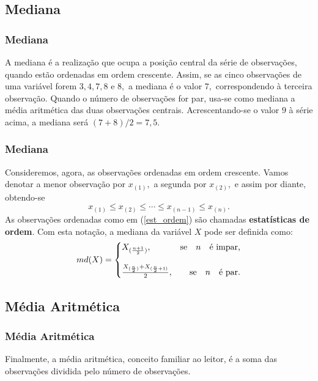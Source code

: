 \documentclass[14pt,aspectratio=1610]{beamer}
\begin{document}
\subsection{Mediana}
\begin{frame}{}
\frametitle{Mediana}
\begin{block}{}
\justifying
A mediana é a realização que ocupa a posição central da série de observações, quando estão ordenadas em ordem crescente. Assim, se as cinco observações de uma variável forem $3, 4, 7, 8$ e $8,$ a mediana é o valor $7,$ correspondendo à terceira 
observação. Quando o número de observações for par, usa-se como mediana a média aritmética das duas observações centrais. Acrescentando-se o valor $9$ à série acima, a mediana será $(7 + 8)/2 = 7,5.$
\end{block}
\end{frame}

\begin{frame}{}
\frametitle{Mediana}
\begin{block}{}
\justifying
Consideremos, agora, as observações ordenadas em ordem crescente. Vamos denotar a
menor observação por $x_{(1)},$ a segunda por $x_{(2)},$ e assim por diante, obtendo-se
\begin{equation}\label{est_ordem}
x_{(1)}\leq x_{(2)}\leq \cdots \leq x_{(n-1)}\leq x_{(n)}.
\end{equation}
As observações ordenadas como em (\ref{est_ordem}) são chamadas {\bf estatísticas de ordem}. Com esta notação, a mediana da variável $X$ pode ser definida como:
$$
md(X)=\left\{
\setlength\arraycolsep{0pt}
\begin{array}{lr}
X_{(\frac{n+1}{2})}, &\quad \textrm{se} \quad n\quad \textrm{é impar,}\\
&\\
\frac{X_{(\frac{n}{2})}+X_{(\frac{n}{2}+1)}}{2},  &\quad \textrm{se}\quad n\quad \textrm{é par.}\\
\end{array}
\right.
$$
\end{block}
\end{frame}
\subsection{Média Aritmética}
\begin{frame}{}
\frametitle{Média Aritmética}
\begin{block}{}
\justifying
Finalmente, a média aritmética, conceito familiar ao leitor, é a soma das observações dividida pelo número de observações.
\end{block}
\end{frame}
\end{document}
